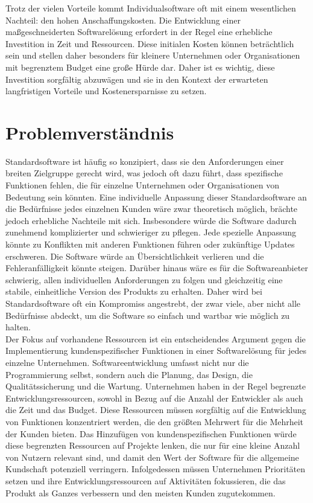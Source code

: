 Trotz der vielen Vorteile kommt Individualsoftware oft mit einem wesentlichen Nachteil: 
den hohen Anschaffungskosten. Die Entwicklung einer maßgeschneiderten Softwarelösung 
erfordert in der Regel eine erhebliche Investition in Zeit und Ressourcen. 
Diese initialen Kosten können beträchtlich sein und stellen daher besonders für 
kleinere Unternehmen oder Organisationen mit begrenztem Budget eine große Hürde dar. 
Daher ist es wichtig, diese Investition sorgfältig abzuwägen und sie in den Kontext der 
erwarteten langfristigen Vorteile und Kostenersparnisse zu setzen.

\newpage
\section{Problemverständnis}

Standardsoftware ist häufig so konzipiert, dass sie den Anforderungen einer breiten 
Zielgruppe gerecht wird, was jedoch oft dazu führt, dass spezifische Funktionen fehlen, 
die für einzelne Unternehmen oder Organisationen von Bedeutung sein könnten. 
Eine individuelle Anpassung dieser Standardsoftware an die Bedürfnisse jedes einzelnen 
Kunden wäre zwar theoretisch möglich, brächte jedoch erhebliche Nachteile mit sich. 
Insbesondere würde die Software dadurch zunehmend komplizierter und 
schwieriger zu pflegen. Jede spezielle Anpassung könnte zu Konflikten mit 
anderen Funktionen führen oder zukünftige Updates erschweren. Die Software würde an 
Übersichtlichkeit verlieren und die Fehleranfälligkeit könnte steigen. 
Darüber hinaus wäre es für die Softwareanbieter schwierig, allen individuellen 
Anforderungen zu folgen und gleichzeitig eine stabile, einheitliche 
Version des Produkts zu erhalten. Daher wird bei Standardsoftware oft ein Kompromiss 
angestrebt, der zwar viele, aber nicht alle Bedürfnisse abdeckt, um die Software so 
einfach und wartbar wie möglich zu halten.\\

Der Fokus auf vorhandene Ressourcen ist ein entscheidendes Argument gegen die Implementierung 
kundenspezifischer Funktionen in einer Softwarelösung für jedes einzelne Unternehmen. 
Softwareentwicklung umfasst nicht nur die Programmierung selbst, sondern auch die Planung, 
das Design, die Qualitätssicherung und die Wartung. Unternehmen haben in der Regel begrenzte 
Entwicklungsressourcen, sowohl in Bezug auf die Anzahl der Entwickler als auch die Zeit und 
das Budget. Diese Ressourcen müssen sorgfältig auf die Entwicklung von Funktionen konzentriert 
werden, die den größten Mehrwert für die Mehrheit der Kunden bieten. Das Hinzufügen von 
kundenspezifischen Funktionen würde diese begrenzten Ressourcen auf Projekte lenken, 
die nur für eine kleine Anzahl von Nutzern relevant sind, und damit den Wert der Software 
für die allgemeine Kundschaft potenziell verringern. Infolgedessen müssen Unternehmen 
Prioritäten setzen und ihre Entwicklungsressourcen auf Aktivitäten fokussieren, 
die das Produkt als Ganzes verbessern und den meisten Kunden zugutekommen.

